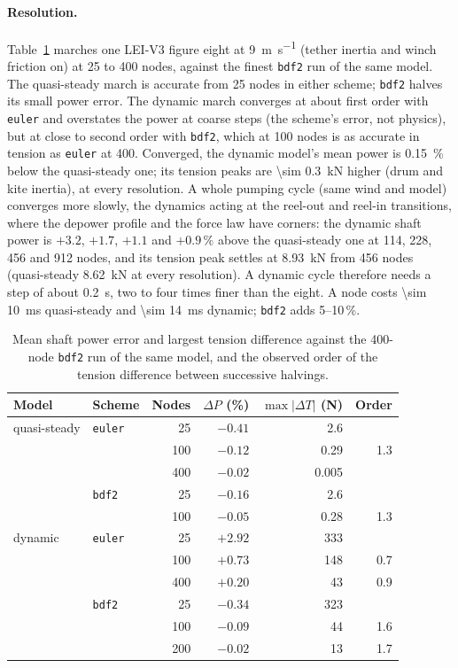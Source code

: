 \documentclass[11pt,a4paper]{article}
\newcommand{\code}[1]{\texttt{\small #1}}
\begin{document}
\paragraph{Resolution.} Table~\ref{tab:resolution} marches one LEI-V3 figure
eight at \SI{9}{m.s^{-1}} (tether inertia and winch friction on) at 25 to 400
nodes, against the finest \code{bdf2} run of the same model. The quasi-steady
march is accurate from 25 nodes in either scheme; \code{bdf2} halves its small
power error. The dynamic march converges at about first order with
\code{euler} and overstates the power at coarse steps (the scheme's error, not
physics), but at close to second order with \code{bdf2}, which at 100 nodes is
as accurate in tension as \code{euler} at 400. Converged, the dynamic model's
mean power is \SI{0.15}{\percent} below the quasi-steady one; its tension
peaks are \SI{\sim 0.3}{kN} higher (drum and kite inertia), at every
resolution. A whole pumping cycle (same wind and model) converges more slowly,
the dynamics acting at the reel-out and reel-in transitions, where the depower
profile and the force law have corners: the dynamic shaft power is
$+3.2$, $+1.7$, $+1.1$ and $+0.9\,\%$ above the quasi-steady one at 114, 228,
456 and 912 nodes, and its tension peak settles at \SI{8.93}{kN} from 456 nodes
(quasi-steady \SI{8.62}{kN} at every resolution). A dynamic cycle therefore
needs a step of about \SI{0.2}{s}, two to four times finer than the eight.
A node costs \SI{\sim 10}{ms} quasi-steady and \SI{\sim 14}{ms}
dynamic; \code{bdf2} adds 5--10\,\%.

\begin{table}[H]
\centering\small
\caption{Mean shaft power error and largest tension difference against the
400-node \code{bdf2} run of the same model, and the observed order of the
tension difference between successive halvings.}
\label{tab:resolution}
\begin{tabular}{llrrrr}
\toprule
Model & Scheme & Nodes & $\Delta P$ (\%) & $\max|\Delta T|$ (N) & Order \\
\midrule
quasi-steady & \code{euler} & 25  & $-0.41$ & 2.6  & \\
             &              & 100 & $-0.12$ & 0.29 & 1.3 \\
             &              & 400 & $-0.02$ & 0.005 & \\
             & \code{bdf2}  & 25  & $-0.16$ & 2.6  & \\
             &              & 100 & $-0.05$ & 0.28 & 1.3 \\
\midrule
dynamic      & \code{euler} & 25  & $+2.92$ & 333  & \\
             &              & 100 & $+0.73$ & 148  & 0.7 \\
             &              & 400 & $+0.20$ & 43   & 0.9 \\
             & \code{bdf2}  & 25  & $-0.34$ & 323  & \\
             &              & 100 & $-0.09$ & 44   & 1.6 \\
             &              & 200 & $-0.02$ & 13   & 1.7 \\
\bottomrule
\end{tabular}
\end{table}
\end{document}
